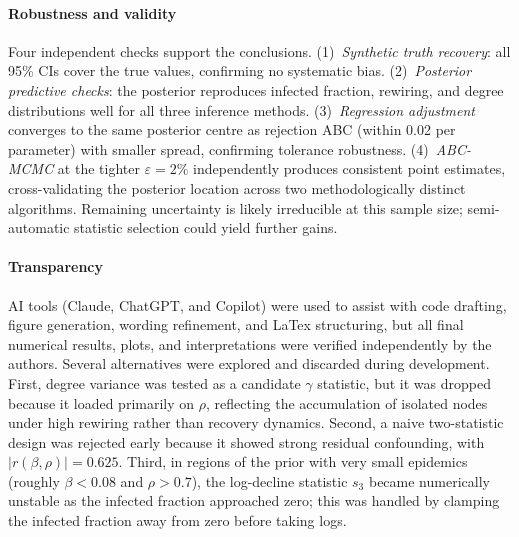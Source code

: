 \documentclass[12pt]{article}
\begin{document}
\paragraph{Robustness and validity}
Four independent checks support the conclusions. (1)~\emph{Synthetic truth recovery}: all 95\% CIs cover the true values, confirming no systematic bias. (2)~\emph{Posterior predictive checks}: the posterior reproduces infected fraction, rewiring, and degree distributions well for all three inference methods. (3)~\emph{Regression adjustment} converges to the same posterior centre as rejection ABC (within 0.02 per parameter) with smaller spread, confirming tolerance robustness. (4)~\emph{ABC-MCMC} at the tighter $\varepsilon=2\%$ independently produces consistent point estimates, cross-validating the posterior location across two methodologically distinct algorithms. Remaining uncertainty is likely irreducible at this sample size; semi-automatic statistic selection \cite{FP12} could yield further gains.

\paragraph{Transparency}
AI tools (Claude, ChatGPT, and Copilot) were used to assist with code drafting, figure generation, wording refinement, and LaTex structuring, but all final numerical results, plots, and interpretations were verified independently by the authors. Several alternatives were explored and discarded during development. First, degree variance was tested as a candidate $\gamma$ statistic, but it was dropped because it loaded primarily on $\rho$, reflecting the accumulation of isolated nodes under high rewiring rather than recovery dynamics. Second, a naive two-statistic design was rejected early because it showed strong residual confounding, with $|r(\beta,\rho)| = 0.625$. Third, in regions of the prior with very small epidemics (roughly $\beta < 0.08$ and $\rho > 0.7$), the log-decline statistic $s_3$ became numerically unstable as the infected fraction approached zero; this was handled by clamping the infected fraction away from zero before taking logs.



\end{document}

